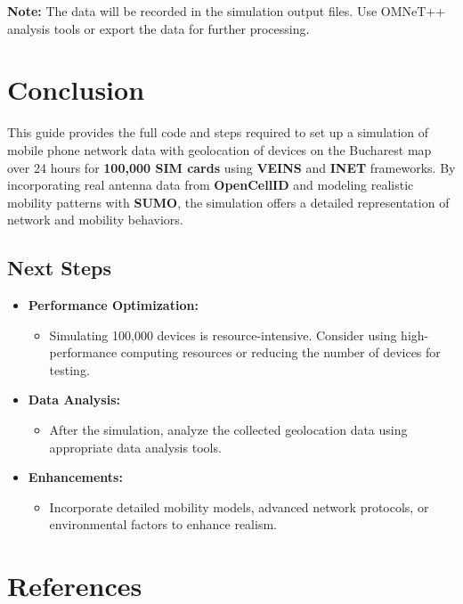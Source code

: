 \documentclass{article}
\begin{document}
		\textbf{Note:} The data will be recorded in the simulation output files. Use OMNeT++ analysis tools or export the data for further processing.
		
		\section{Conclusion}
		
		This guide provides the full code and steps required to set up a simulation of mobile phone network data with geolocation of devices on the Bucharest map over 24 hours for \textbf{100,000 SIM cards} using \textbf{VEINS} and \textbf{INET} frameworks. By incorporating real antenna data from \textbf{OpenCellID} and modeling realistic mobility patterns with \textbf{SUMO}, the simulation offers a detailed representation of network and mobility behaviors.
		
		\subsection*{Next Steps}
		
		\begin{itemize}
			\item \textbf{Performance Optimization:}
			\begin{itemize}
				\item Simulating 100,000 devices is resource-intensive. Consider using high-performance computing resources or reducing the number of devices for testing.
			\end{itemize}
			\item \textbf{Data Analysis:}
			\begin{itemize}
				\item After the simulation, analyze the collected geolocation data using appropriate data analysis tools.
			\end{itemize}
			\item \textbf{Enhancements:}
			\begin{itemize}
				\item Incorporate detailed mobility models, advanced network protocols, or environmental factors to enhance realism.
			\end{itemize}
		\end{itemize}
		
		\section{References}
		
\end{document}
